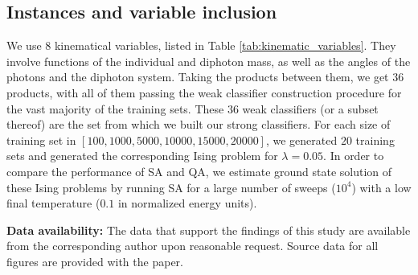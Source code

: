 \subsection{Instances and variable inclusion}
We use $8$ kinematical variables, listed in Table \ref{tab:kinematic_variables}. They involve functions of the individual and diphoton mass, as well as the angles of the photons and the diphoton system. Taking the products between them, we get $36$ products, with all of them passing the weak classifier construction procedure for the vast majority of the training sets. These $36$ weak classifiers (or a subset thereof) are the set from which we built our strong classifiers.  For each size of training set in $[100,1000,5000,10000,15000,20000]$, we generated $20$ training sets and generated the corresponding Ising problem for $\lambda=0.05$. In order to compare the performance of SA and QA, we estimate ground state solution of these Ising problems by running SA for a large number of sweeps ($10^4$) with a low final temperature ($0.1$ in normalized energy units).

\textbf{Data availability:} The data that support the findings of this study are available from the corresponding
author upon reasonable request. Source data for all figures are provided with the paper.

